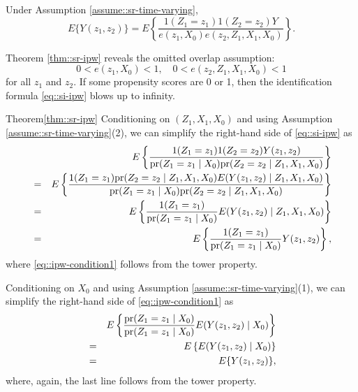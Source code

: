 \begin{theorem}
\label{thm::sr-ipw}
Under Assumption \ref{assume::sr-time-varying}, 
\begin{equation}
E\{ Y(z_1, z_2) \} 
= E\left\{    \frac{  1(Z_1=z_1) 1(Z_2=z_2) Y  }{   e(z_1, X_0)  e(z_2,Z_1, X_1,  X_0)     }   \right\} .
\label{eq::si-ipw}
\end{equation}
\end{theorem}


Theorem \ref{thm::sr-ipw} reveals the omitted overlap assumption:
$$
0< e(z_1, X_0)   <1,\quad
0< e(z_2, Z_1, X_1,  X_0)   < 1
$$
for all $z_1$ and $z_2$. If some propensity scores are 0 or 1, then the identification formula \eqref{eq::si-ipw} blows up to infinity. 



\begin{myproof}{Theorem}{\ref{thm::sr-ipw}}
Conditioning on $(Z_1, X_1, X_0)$ and using Assumption \ref{assume::sr-time-varying}(2), we can simplify the right-hand side of \eqref{eq::si-ipw} as 
\begin{eqnarray} 
&&E\left\{    \frac{  1(Z_1=z_1) 1(Z_2=z_2) Y(z_1,z_2)  }{    \pr(Z_1=z_1\mid X_0)  \pr(Z_2 = z_2 \mid Z_1, X_1, X_0)    }   \right\} \nonumber  \\
&=& E\left\{    \frac{  1(Z_1=z_1) \pr(Z_2=z_2\mid Z_1, X_1, X_0) E(Y(z_1,z_2) \mid Z_1, X_1, X_0)  }{    \pr(Z_1=z_1\mid X_0)  \pr(Z_2 = z_2 \mid Z_1, X_1, X_0)    }   \right\}  \nonumber    \\
&=& E\left\{    \frac{  1(Z_1=z_1)    }{    \pr(Z_1=z_1\mid X_0)     }  E(Y(z_1,z_2) \mid Z_1, X_1, X_0)  \right\}   \nonumber   \\
&=& E\left\{    \frac{  1(Z_1=z_1)    }{    \pr(Z_1=z_1\mid X_0)     }  Y(z_1,z_2)  \right\}, \label{eq::ipw-condition1}
\end{eqnarray}
where \eqref{eq::ipw-condition1} follows from the tower property. 


Conditioning on $X_0$ and using Assumption \ref{assume::sr-time-varying}(1), we can simplify the right-hand side of \eqref{eq::ipw-condition1} as 
\begin{eqnarray*} 
&& E\left\{    \frac{  \textup{pr}(Z_1=z_1\mid X_0)    }{    \textup{pr}(Z_1=z_1\mid X_0)     }  E(Y(z_1,z_2) \mid X_0)  \right\}\\
&=& E\left\{    E(Y(z_1,z_2) \mid X_0)  \right\}\\
&=&  E\{Y(z_1,z_2)\},
\end{eqnarray*}
where, again, the last line follows from the tower property. 
\end{myproof}



